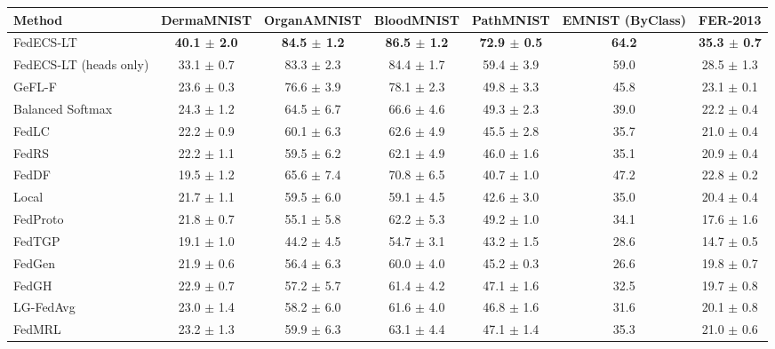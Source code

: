 \begin{tabular}{lcccccc}
\toprule
Method & DermaMNIST & OrganAMNIST & BloodMNIST & PathMNIST & EMNIST (ByClass) & FER-2013\\
\midrule
FedECS-LT & \textbf{40.1 $\pm$ 2.0} & \textbf{84.5 $\pm$ 1.2} & \textbf{86.5 $\pm$ 1.2} & \textbf{72.9 $\pm$ 0.5} & \textbf{64.2} & \textbf{35.3 $\pm$ 0.7}\\
FedECS-LT (heads only) & 33.1 $\pm$ 0.7 & 83.3 $\pm$ 2.3 & 84.4 $\pm$ 1.7 & 59.4 $\pm$ 3.9 & 59.0 & 28.5 $\pm$ 1.3\\
GeFL-F & 23.6 $\pm$ 0.3 & 76.6 $\pm$ 3.9 & 78.1 $\pm$ 2.3 & 49.8 $\pm$ 3.3 & 45.8 & 23.1 $\pm$ 0.1\\
Balanced Softmax & 24.3 $\pm$ 1.2 & 64.5 $\pm$ 6.7 & 66.6 $\pm$ 4.6 & 49.3 $\pm$ 2.3 & 39.0 & 22.2 $\pm$ 0.4\\
FedLC & 22.2 $\pm$ 0.9 & 60.1 $\pm$ 6.3 & 62.6 $\pm$ 4.9 & 45.5 $\pm$ 2.8 & 35.7 & 21.0 $\pm$ 0.4\\
FedRS & 22.2 $\pm$ 1.1 & 59.5 $\pm$ 6.2 & 62.1 $\pm$ 4.9 & 46.0 $\pm$ 1.6 & 35.1 & 20.9 $\pm$ 0.4\\
FedDF & 19.5 $\pm$ 1.2 & 65.6 $\pm$ 7.4 & 70.8 $\pm$ 6.5 & 40.7 $\pm$ 1.0 & 47.2 & 22.8 $\pm$ 0.2\\
Local & 21.7 $\pm$ 1.1 & 59.5 $\pm$ 6.0 & 59.1 $\pm$ 4.5 & 42.6 $\pm$ 3.0 & 35.0 & 20.4 $\pm$ 0.4\\
FedProto & 21.8 $\pm$ 0.7 & 55.1 $\pm$ 5.8 & 62.2 $\pm$ 5.3 & 49.2 $\pm$ 1.0 & 34.1 & 17.6 $\pm$ 1.6\\
FedTGP & 19.1 $\pm$ 1.0 & 44.2 $\pm$ 4.5 & 54.7 $\pm$ 3.1 & 43.2 $\pm$ 1.5 & 28.6 & 14.7 $\pm$ 0.5\\
FedGen & 21.9 $\pm$ 0.6 & 56.4 $\pm$ 6.3 & 60.0 $\pm$ 4.0 & 45.2 $\pm$ 0.3 & 26.6 & 19.8 $\pm$ 0.7\\
FedGH & 22.9 $\pm$ 0.7 & 57.2 $\pm$ 5.7 & 61.4 $\pm$ 4.2 & 47.1 $\pm$ 1.6 & 32.5 & 19.7 $\pm$ 0.8\\
LG-FedAvg & 23.0 $\pm$ 1.4 & 58.2 $\pm$ 6.0 & 61.6 $\pm$ 4.0 & 46.8 $\pm$ 1.6 & 31.6 & 20.1 $\pm$ 0.8\\
FedMRL & 23.2 $\pm$ 1.3 & 59.9 $\pm$ 6.3 & 63.1 $\pm$ 4.4 & 47.1 $\pm$ 1.4 & 35.3 & 21.0 $\pm$ 0.6\\
\bottomrule
\end{tabular}
